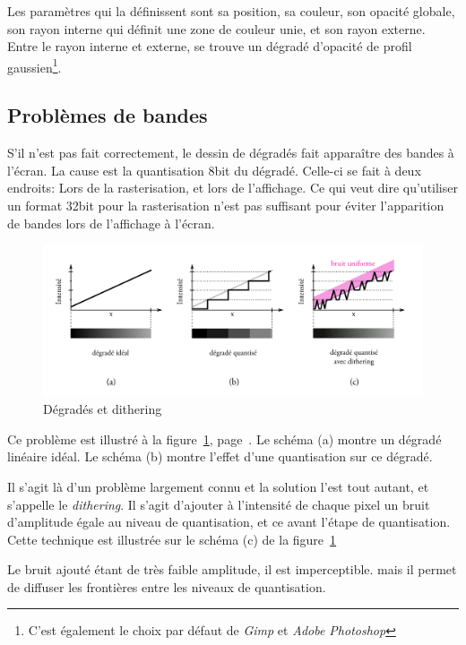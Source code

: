 	Les paramètres qui la définissent sont sa position, sa couleur, son opacité globale, 
	son rayon interne qui définit une zone de couleur unie, et son rayon externe. Entre le rayon interne
	et externe, se trouve un dégradé d'opacité de profil gaussien\footnote{C'est également le choix par défaut de \emph{Gimp} et \emph{Adobe Photoshop}}.

	\subsection{Problèmes de bandes}
		S'il n'est pas fait correctement, le dessin de dégradés fait apparaître des
		bandes à l'écran. La cause est la quantisation 8bit du dégradé. Celle-ci se
		fait à deux endroits: Lors de la rasterisation, et lors de l'affichage. Ce qui veut
		dire qu'utiliser un format 32bit pour la rasterisation n'est pas suffisant pour
		éviter l'apparition de bandes lors de l'affichage à l'écran. 

		\begin{figure}[ht]
			\centering
			\includegraphics[width=\textwidth]{images/degrades} 
			\caption{Dégradés et dithering}
			\label{fig:dithering}
		\end{figure}

		Ce problème est illustré à la figure~\ref{fig:dithering}, page~\pageref{fig:dithering}.
		Le schéma (a) montre un dégradé linéaire idéal. Le schéma (b) montre l'effet 
		d'une quantisation sur ce dégradé. 

		Il s'agit là d'un problème largement connu et la solution l'est tout autant,
		et s'appelle le \emph{dithering}. Il s'agit d'ajouter à l'intensité de chaque pixel
		un bruit d'amplitude égale au niveau de quantisation, et ce avant l'étape
		de quantisation. Cette technique est illustrée sur le schéma (c) de la figure~\ref{fig:dithering} 

		Le bruit ajouté étant de très faible amplitude, il est imperceptible. mais il permet de diffuser
		les frontières entre les niveaux de quantisation.

